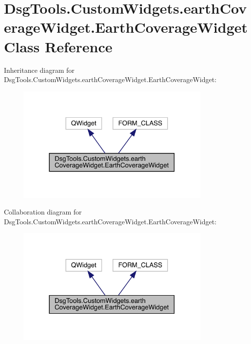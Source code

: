 \hypertarget{class_dsg_tools_1_1_custom_widgets_1_1earth_coverage_widget_1_1_earth_coverage_widget}{}\section{Dsg\+Tools.\+Custom\+Widgets.\+earth\+Coverage\+Widget.\+Earth\+Coverage\+Widget Class Reference}
\label{class_dsg_tools_1_1_custom_widgets_1_1earth_coverage_widget_1_1_earth_coverage_widget}


Inheritance diagram for Dsg\+Tools.\+Custom\+Widgets.\+earth\+Coverage\+Widget.\+Earth\+Coverage\+Widget\+:
\nopagebreak
\begin{figure}[H]
\begin{center}
\leavevmode
\includegraphics[width=272pt]{class_dsg_tools_1_1_custom_widgets_1_1earth_coverage_widget_1_1_earth_coverage_widget__inherit__graph}
\end{center}
\end{figure}


Collaboration diagram for Dsg\+Tools.\+Custom\+Widgets.\+earth\+Coverage\+Widget.\+Earth\+Coverage\+Widget\+:
\nopagebreak
\begin{figure}[H]
\begin{center}
\leavevmode
\includegraphics[width=272pt]{class_dsg_tools_1_1_custom_widgets_1_1earth_coverage_widget_1_1_earth_coverage_widget__coll__graph}
\end{center}
\end{figure}
